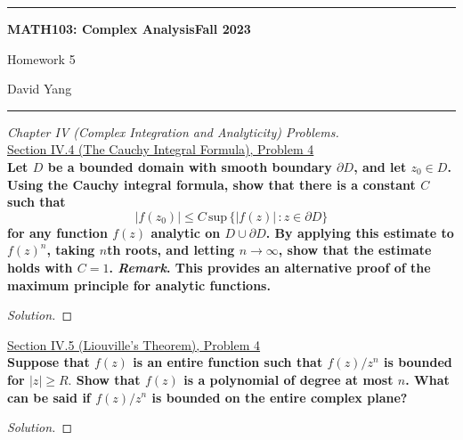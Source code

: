 \documentclass[11pt]{article}
\newenvironment{solution}
  {\renewcommand\qedsymbol{$\blacksquare$}\begin{proof}[Solution]}
  {\end{proof}}
\theoremstyle{definition}
\begin{document}
	\hrule
	\begin{center}
        \textbf{MATH103: Complex Analysis}\hfill \textbf{Fall 2023}\newline

		{\Large Homework 5}

		David Yang
	\end{center}

\hrule

\vspace{1em}


\textit{Chapter IV (Complex Integration and Analyticity) Problems.} \\

\underline{Section IV.4 (The Cauchy Integral Formula), Problem 4} \\

\textbf{Let $D$ be a bounded domain with smooth boundary $\partial D$, and let $z_0 \in D$. Using the Cauchy integral formula, show that there is a constant $C$ such that}
\[ |f(z_0)| \leq C \, \mathrm{sup} \, \{|f(z)| \, : z \in \partial D\}\]
\textbf{for any function $f(z)$ analytic on $D \cup \partial D$. By applying this estimate to $f(z)^n$, taking $n$th roots, and letting $n \rightarrow \infty$, show that the estimate holds
with $C=1$. \textit{Remark}. This provides an alternative proof of the maximum principle for analytic functions.} \\

\begin{solution}

\end{solution}
\underline{Section IV.5 (Liouville's Theorem), Problem 4} \\

\textbf{Suppose that $f(z)$ is an entire function such that $f(z)/z^n$ is bounded for $|z| \geq R.$ Show that $f(z)$ is a polynomial of degree at most $n$. What can be said
if $f(z)/z^n$ is bounded on the entire complex plane?}

\begin{solution}
    
\end{solution}
\end{document}
